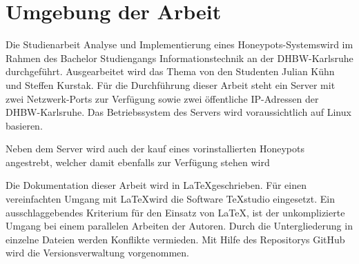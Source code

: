\section{Umgebung der Arbeit}
Die Studienarbeit \glqq Analyse und Implementierung eines Honeypots-Systems\grqq wird im Rahmen des Bachelor Studiengangs Informationstechnik an der DHBW-Karlsruhe durchgeführt. Ausgearbeitet wird das Thema von den Studenten Julian Kühn und Steffen Kurstak. Für die Durchführung dieser Arbeit steht ein Server mit zwei Netzwerk-Ports zur Verfügung sowie zwei öffentliche IP-Adressen der DHBW-Karlsruhe. Das Betriebssystem des Servers wird voraussichtlich auf Linux basieren.

Neben dem Server wird auch der kauf eines vorinstallierten Honeypots angestrebt, welcher damit ebenfalls zur Verfügung stehen wird

Die Dokumentation dieser Arbeit wird in \LaTeX geschrieben. Für einen vereinfachten Umgang mit \LaTeX wird die Software TeXstudio eingesetzt. Ein ausschlaggebendes Kriterium für den Einsatz von \LaTeX, ist der unkomplizierte Umgang bei einem parallelen Arbeiten der Autoren. Durch die Untergliederung in einzelne Dateien werden Konflikte vermieden. Mit Hilfe des Repositorys GitHub wird die Versionsverwaltung vorgenommen. 